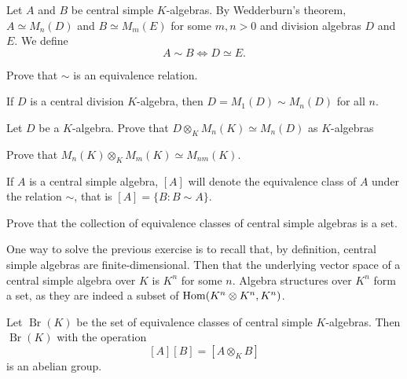 Let $A$ and $B$ be central simple $K$-algebras. By Wedderburn's theorem, 
$A\simeq M_n(D)$ and $B\simeq M_m(E)$ for some $m,n>0$ and 
division algebras $D$ and $E$. We define 
\[
    A\sim B\Longleftrightarrow D\simeq E.
\]

\begin{exercise}
    Prove that $\sim$ is an equivalence relation. 
\end{exercise}

If $D$ is a central division $K$-algebra, then $D=M_1(D)\sim M_n(D)$ for all $n$.

\begin{exercise}
    Let $D$ be a $K$-algebra. 
    Prove that $D\otimes_K M_n(K)\simeq M_n(D)$ as $K$-algebras
\end{exercise}

\begin{exercise}
    Prove that $M_n(K)\otimes_K M_m(K)\simeq M_{nm}(K)$. 
\end{exercise}

If $A$ is a central simple algebra, $[A]$ will denote
the equivalence class of $A$ under the relation $\sim$, that is 
$[A]=\{B:B\sim A\}$. 

\begin{exercise}
    Prove that the collection of equivalence classes of central simple 
    algebras is a set. 
\end{exercise}

One way to solve the previous exercise is to recall that, by definition, central simple algebras
are finite-dimensional. Then that the underlying 
vector space of a central simple algebra over $K$ is $K^n$ for some $n$. Algebra
structures over $K^n$ form a set, as they are indeed a subset of $\operatorname{Hom}(K^n\otimes K^n,K^n)$. 

\begin{theorem}
    Let $\operatorname{Br}(K)$ be the set of equivalence classes
    of central simple $K$-algebras. Then $\operatorname{Br}(K)$ with 
    the operation 
    \begin{equation}
        \label{eq:Brauer}
        [A][B]=[A\otimes_KB]
    \end{equation}
    is an abelian group. 
\end{theorem}

